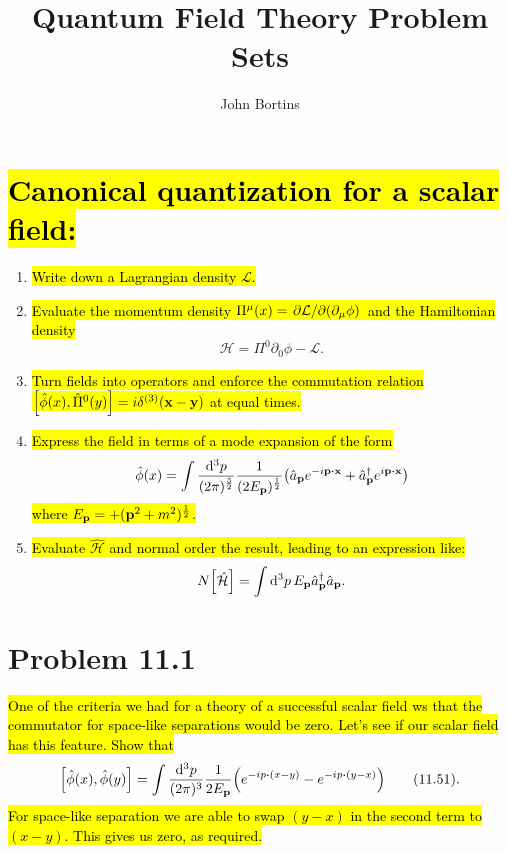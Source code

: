 \documentclass{article}
\title{Quantum Field Theory Problem Sets}
\author{John Bortins}
\begin{document}
\maketitle{}

\section*{\hl{Canonical quantization for a scalar field:}}
\begin{enumerate}[label=\Roman*.]
    \item \hl{Write down a Lagrangian density $\mathcal{L}$.}
    \item \hl{Evaluate the momentum density $\Pi^\mu (x)=\pdv*{\mathcal{L}}{(\partial_\mu \phi)}$ and the Hamiltonian density}
          \[\mathcal{H}=\Pi^0 \partial_0 \phi-\mathcal{L}.\]
    \item \hl{Turn fields into operators and enforce the commutation relation $\bqty{\hat{\phi}(x),\hat{\Pi}^0 (y)}=i\delta^{(3)}(\vb{x}-\vb{y})$ at equal times.}
    \item \hl{Express the field in terms of a mode expansion of the form}
          \[\hat{\phi}(x)=\int\frac{\dd[3]{p}}{(2\pi)^{\frac{3}{2}}}\frac{1}{(2E_{\vb{p}})^{\frac{1}{2}}}\pqty{\hat{a}_{\vb{p}}e^{-i\vb{p}\vdot\vb{x}}+\hat{a}^\dagger_{\vb{p}}e^{i\vb{p}\vdot\vb{x}}} \]
          \hl{where $E_{\vb{p}}=+(\vb{p}^2+m^2)^{\frac{1}{2}}$.}
    \item \hl{Evaluate $\hat{\mathcal{H}}$ and normal order the result, leading to an expression like:}
          \[ N\bqty{\hat{\mathcal{H}}}=\int\dd[3]{p}E_{\vb{p}}\hat{a}^\dagger_{\vb{p}}\hat{a}_{\vb{p}}.\]
\end{enumerate}
\pagebreak


\section*{Problem 11.1}
\begin{quoting}
    \hl{One of the criteria we had for a theory of a successful scalar field ws that the commutator for space-like separations would be zero. Let's see if our scalar field has this feature. Show that}\[\bqty{\hat{\phi}(x),\hat{\phi}(y)}=\int\frac{\dd[3]{p}}{(2\pi)^3}\frac{1}{2E_{\vb{p}}}\pqty{e^{-ip\vdot(x-y)}-e^{-ip\vdot(y-x)}}\qquad(11.51).\]\hl{For space-like separation we are able to swap $(y-x)$ in the second term to $(x-y)$. This gives us zero, as required.}
\end{quoting}
\end{document}
